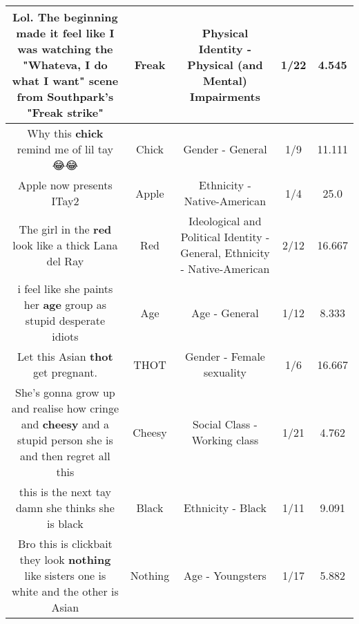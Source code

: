 \documentclass[11pt]{article}
\newlength\mylength
\begin{document}
\begin{center}
\begin{longtable}{|C{.65\mylength}|C{.30\mylength}|C{.12\mylength}|C{.12\mylength}|C{.12\mylength}|}
  \small Lol. The beginning made it feel like I was watching the "Whateva, I do what I want" scene from Southpark's "\textbf{Freak} strike"\normalsize   & Freak & Physical Identity - Physical (and Mental) Impairments & 1/22 & 4.545 \\  \hline
  \small Why this \textbf{chick} remind me of lil tay 😂😂\normalsize   & Chick & Gender - General & 1/9 & 11.111 \\  \hline
  \small Apple now presents ITay2\normalsize   & Apple & Ethnicity - Native-American & 1/4 & 25.0 \\  \hline
  \small The girl in the \textbf{r\textbf{ed}} look like a thick Lana del Ray\normalsize   & Red &  Ideological and Political Identity - General, Ethnicity - Native-American & 2/12 & 16.667 \\  \hline
  \small i feel like she paints her \textbf{age} group as stupid desperate idiots\normalsize   & Age & Age - General & 1/12 & 8.333 \\  \hline
  \small Let this Asian \textbf{thot} get pregnant.\normalsize   & THOT & Gender - Female sexuality & 1/6 & 16.667 \\  \hline
  \small She's gonna  grow up and realise how cringe and \textbf{cheesy} and a stupid person she is and then regret all this\normalsize   & Cheesy & Social Class - Working class & 1/21 & 4.762 \\  \hline
  \small this is the next tay damn she thinks she is black\normalsize   & Black & Ethnicity - Black & 1/11 & 9.091 \\  \hline
  \small Bro this is clickbait they look \textbf{nothing} like sisters one is white and the other is Asian\normalsize   & Nothing & Age - Youngsters & 1/17 & 5.882 \\  \hline

\end{longtable}
\end{center}
\end{document}
